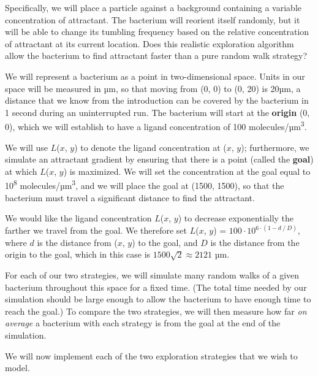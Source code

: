 Specifically, we will place a particle against a background containing a variable concentration of attractant. The bacterium will reorient itself randomly, but it will be able to change its tumbling frequency based on the relative concentration of attractant at its current location. Does this realistic exploration algorithm allow the bacterium to find attractant faster than a pure random walk strategy?

We will represent a bacterium as a point in two-dimensional space. Units in our space will be measured in µm, so that moving from (0, 0) to (0, 20) is 20µm, a distance that we know from the introduction can be covered by the bacterium in 1 second during an uninterrupted run. The bacterium will start at the \textbf{origin} (0, 0), which we will establish to have a ligand concentration of 100 molecules/µm\textsuperscript{3}.

We will use $L$($x$, $y$) to denote the ligand concentration at ($x$, $y$); furthermore, we simulate an attractant gradient by ensuring that there is a point (called the \textbf{goal}) at which $L$($x$, $y$) is maximized. We will set the concentration at the goal equal to 10\textsuperscript{8} molecules/µm\textsuperscript{3}, and we will place the goal at (1500, 1500), so that the bacterium must travel a significant distance to find the attractant.

We would like the ligand concentration $L$($x$, $y$) to decrease exponentially the farther we travel from the goal. We therefore set $L$($x$, $y$) = $100 \cdot 10^{6 \cdot (1-d\mathbin{/}D)}$, where $d$ is the distance from ($x$, $y$) to the goal, and $D$ is the distance from the origin to the goal, which in this case is $1500\sqrt{2} \approx 2121$ µm.

\begin{qbox}\end{qbox}

For each of our two strategies, we will simulate many random walks of a given bacterium throughout this space for a fixed time. (The total time needed by our simulation should be large enough to allow the bacterium to have enough time to reach the goal.) To compare the two strategies, we will then measure how far \textit{on average} a bacterium with each strategy is from the goal at the end of the simulation.

We will now implement each of the two exploration strategies that we wish to model.

